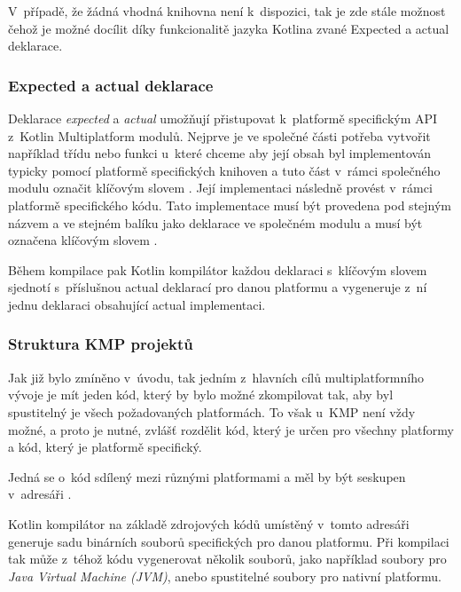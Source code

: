 V~případě, že žádná vhodná knihovna není k~dispozici, tak je zde stále možnost čehož je možné docílit díky funkcionalitě jazyka Kotlina
zvané Expected a actual deklarace.

\subsubsection*{Expected a actual deklarace}\label{expectActual}
Deklarace \textit{expected} a \textit{actual} umožňují přistupovat k~platformě specifickým API z~Kotlin Multiplatform modulů. \cite{KMPExpectActual}
Nejprve je ve společné části potřeba vytvořit například třídu nebo funkci u~které chceme aby její obsah byl implementován typicky pomocí
platformě specifických knihoven a tuto část v~rámci společného modulu označit klíčovým slovem . \cite{KMPExpectActual} Její implementaci následně provést v~rámci
platformě specifického kódu. Tato implementace musí být provedena pod stejným názvem a ve stejném balíku jako deklarace ve společném modulu
a musí být označena klíčovým slovem . \cite{KMPExpectActual}

Během kompilace pak Kotlin kompilátor každou deklaraci s~klíčovým slovem  sjednotí s~příslušnou actual deklarací pro danou platformu
a vygeneruje z~ní jednu deklaraci obsahující actual implementaci. \cite{KMPExpectActual}

\subsubsection*{Struktura KMP projektů}\label{projectStructure}
Jak již bylo zmíněno v~úvodu, tak jedním z~hlavních cílů multiplatformního vývoje je mít 
jeden kód, který by bylo možné zkompilovat tak, aby byl spustitelný je všech požadovaných platformách. To však u~KMP není vždy 
možné, a proto je nutné, zvlášť rozdělit kód, který je určen pro všechny platformy a kód, který je platformě specifický. 

Jedná se o~kód sdílený mezi různými platformami a měl by být seskupen v~adresáři . \cite{KMPCommonCode}

Kotlin kompilátor na základě zdrojových kódů umístěný v~tomto adresáři generuje sadu binárních souborů specifických pro danou platformu. \cite{KMPCommonCode}
Při kompilaci tak může z~téhož kódu vygenerovat několik souborů, jako například soubory pro \textit{Java Virtual Machine (JVM)}, 
anebo spustitelné soubory pro nativní platformu. \cite{KMPCommonCode}

